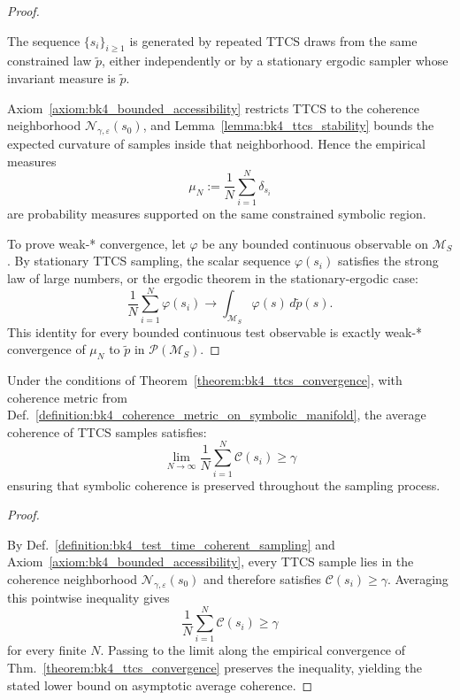 \begin{proof}
\label{proof:bk4_ttcs_convergence}
\leavevmode

\begin{assumption}
The sequence $\{s_i\}_{i\geq 1}$ is generated by repeated TTCS draws from the
same constrained law $\tilde p$, either independently or by a stationary ergodic
sampler whose invariant measure is $\tilde p$.
\end{assumption}

Axiom~\ref{axiom:bk4_bounded_accessibility} restricts TTCS to the coherence
neighborhood $\mathcal N_{\gamma,\varepsilon}(s_0)$, and
Lemma~\ref{lemma:bk4_ttcs_stability} bounds the expected curvature of samples
inside that neighborhood. Hence the empirical measures
\[
\mu_N := \frac1N\sum_{i=1}^N\delta_{s_i}
\]
are probability measures supported on the same constrained symbolic region.

To prove weak-* convergence, let $\varphi$ be any bounded continuous observable
on $\mathcal M_S$. By stationary TTCS sampling, the scalar sequence
$\varphi(s_i)$ satisfies the strong law of large numbers, or the ergodic theorem
in the stationary-ergodic case:
\[
\frac1N\sum_{i=1}^N\varphi(s_i)
  \longrightarrow \int_{\mathcal M_S}\varphi(s)\,d\tilde p(s).
\]
This identity for every bounded continuous test observable is exactly weak-*
convergence of $\mu_N$ to $\tilde p$ in $\mathcal P(\mathcal M_S)$.
\end{proof}

\begin{corollary}
\label{corollary:bk4_coherence_preservation}
Under the conditions of Theorem~\ref{theorem:bk4_ttcs_convergence}, with coherence metric from Def.~\ref{definition:bk4_coherence_metric_on_symbolic_manifold}, the average coherence of TTCS samples satisfies:
\[
\lim_{N \to \infty} \frac{1}{N} \sum_{i=1}^N \mathcal{C}(s_i) \geq \gamma
\]
ensuring that symbolic coherence is preserved throughout the sampling process.
\end{corollary}

\begin{proof}
\label{proof:bk4_coherence_preservation}
\leavevmode

By Def.~\ref{definition:bk4_test_time_coherent_sampling} and
Axiom~\ref{axiom:bk4_bounded_accessibility}, every TTCS sample lies in the
coherence neighborhood $\mathcal N_{\gamma,\varepsilon}(s_0)$ and therefore
satisfies $\mathcal C(s_i)\geq\gamma$. Averaging this pointwise inequality gives
\[
\frac1N\sum_{i=1}^N\mathcal C(s_i)\geq\gamma
\]
for every finite $N$. Passing to the limit along the empirical convergence of
Thm.~\ref{theorem:bk4_ttcs_convergence} preserves the inequality, yielding the
stated lower bound on asymptotic average coherence.
\end{proof}

